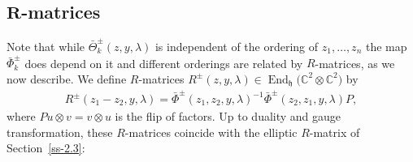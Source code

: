 \documentclass[10pt,a4paper]{amsart}
\numberwithin{equation}{section}
\begin{document}
\subsection[$R$-matrices]{$\boldsymbol{R}$-matrices}\label{ss-3.6}
Note that while $\bar\Theta^{\pm}_k(z,y,\lambda)$ is independent of the ordering of $z_1,\dots,z_n$ the map $\bar\Phi_k^\pm$ does depend on it and different orderings are related by $R$-matrices, as we now describe. We
define $R$-matrices $R^\pm(z,y,\lambda)\in\operatorname{End}_{\mathfrak h}\big(\mathbb C^2\otimes\mathbb C^2\big)$ by
\begin{gather*}
 R^{\pm}(z_1-z_2,y,\lambda) =\bar\Phi^\pm(z_1,z_2,y,\lambda)^{-1} \bar\Phi^\pm(z_2,z_1,y,\lambda)P,
\end{gather*}
where $Pu\otimes v=v\otimes u$ is the flip of factors. Up to duality and gauge transformation, these $R$-matrices coincide with the elliptic $R$-matrix of Section~\ref{ss-2.3}:
\end{document}
